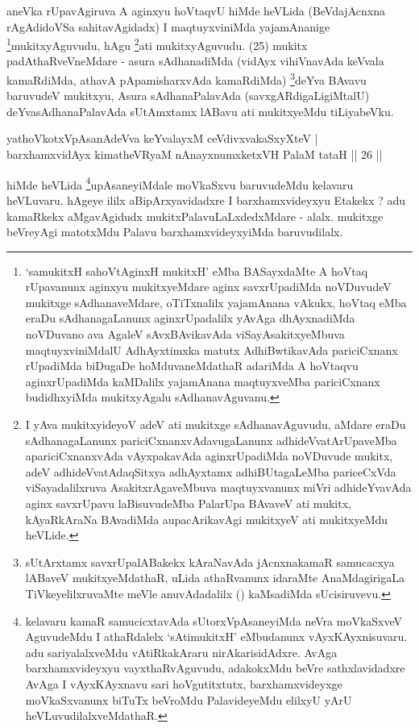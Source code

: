 \begin{artha}
aneVka rUpavAgiruva A aginxyu hoVtaqvU hiMde heVLida (BeVdajAcnxna rAgAdidoVSa sahitavAgidadx) I maqtuyxviniMda yajamAnanige \footnote[1]{`samukitxH sahoVtA\s ginxH mukitxH' eMba BASayxdaMte A hoVtaq rUpavanunx aginxyu mukitxyeMdare aginx savxrUpadiMda noVDuvudeV mukitxge sAdhanaveMdare, oTiTxnalilx yajamAnana vAkukx, hoVtaq eMba eraDu sAdhanagaLanunx aginxrUpadalilx yAvAga dhAyxnadiMda noVDuvano ava AgaleV sAvxBAvikavAda viSayAsakitxyeMbuva maqtuyxviniMdalU AdhAyxtimxka matutx AdhiBwtikavAda pariciCxnanx rUpadiMda biDugaDe hoMduvaneMdathaR adariMda A hoVtaqvu aginxrUpadiMda kaMDalilx yajamAnana maqtuyxveMba pariciCxnanx budidhxyiMda mukitxyAgalu sAdhanavAguvanu.}mukitxyAgu\-vudu, hAgu \footnote[2]{I yAva mukitxyideyoV adeV ati mukitxge sAdhanavAguvudu, aMdare eraDu sAdhanagaLanunx pariciCxnanxvAdavugaLanunx adhideVvatArUpaveMba apariciCxnanxvAda vAyxpakavAda aginxrUpadiMda noVDuvude mukitx, adeV adhideVvatAdaqSitxya adhAyxtamx adhiBUtagaLeMba pariceCxVda viSayadalilxruva AsakitxrAgaveMbuva maqtuyxvanunx miVri adhideYvavAda aginx savxrUpavu laBisuvudeMba PalarUpa BAvaveV ati mukitx, kAyaRkAraNa BAvadiMda aupacArikavAgi mukitxyeV ati mukitxyeMdu heVLide.}ati mukitxyAguvudu. (25) mukitx padAthaRveVneMdare - asura sAdhanadiMda (vidAyx vihiVnavAda keVvala kamaRdiMda, athavA pApamisharxvAda kamaRdiMda) \footnote[1]{sUtArxtamx savxrUpalABakekx kAraNavAda jAcnxnakamaR samucacxya lABaveV mukitxyeMdathaR, uLida athaRvanunx idaraMte AnaMdagirigaLa TiVkeyelilxruvaMte meVle anuvAdadalilx (\quad) kaMsadiMda sUcisiruvevu.}deYva BAvavu baruvudeV mukitxyu, Asura sAdhanaPalavAda (savxgARdigaLigiMtalU) deYvasAdhanaPalavAda sUtAmxtamx lABavu ati mukitxyeMdu tiLiyabeVku.
\end{artha}


\begin{shl}
yathoVkotxVpAsanAdeVva keYvalayxM ceVdivxvakaSxyXteV |\\
barxhamxvidAyx kimatheVRyaM nAnayxnumxketxVH PalaM tataH \hfill || 26 ||
\end{shl}

\begin{artha}
hiMde heVLida \footnote[2]{kelavaru kamaR samucicxtavAda sUtorxVpAsaneyiMda neVra moVkaSxveV AguvudeMdu I athaRdalelx `sAtimukitxH' eMbudanunx vAyxKAyxnisuvaru. adu sariyalalxveMdu vAtiRkakAraru nirAkarisidAdxre. AvAga barxhamxvideyxyu vayxthaRvAguvudu, adakokxMdu beVre sathxlavidadxre AvAga I vAyxKAyxnavu sari hoVgutitxtutx, barxhamxvideyxge moVkaSxvanunx biTuTx beVroMdu PalavideyeMdu elilxyU yArU heVLuvudilalxveMdathaR.}upAsaneyiMdale moVkaSxvu baruvudeMdu kelavaru heVLuvaru. hAgeye ililx aBipArxyavidadxre I barxhamxvideyxyu Etakekx ? adu kamaRkekx aMgavAgidudx mukitxPalavuLaLxdedxMdare - alalx. mukitxge beVreyAgi matotxMdu Palavu barxhamxvideyxyiMda baruvudilalx.
\end{artha}

